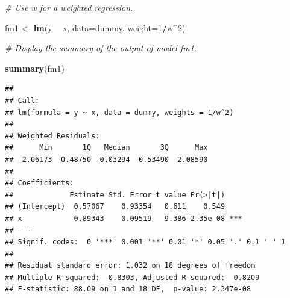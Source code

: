\documentclass[]{book}
\newenvironment{Shaded}{\begin{snugshade}}{\end{snugshade}}
\newcommand{\CommentTok}[1]{\textcolor[rgb]{0.56,0.35,0.01}{\textit{#1}}}
\newcommand{\DataTypeTok}[1]{\textcolor[rgb]{0.13,0.29,0.53}{#1}}
\newcommand{\DecValTok}[1]{\textcolor[rgb]{0.00,0.00,0.81}{#1}}
\newcommand{\KeywordTok}[1]{\textcolor[rgb]{0.13,0.29,0.53}{\textbf{#1}}}
\newcommand{\NormalTok}[1]{#1}
\newcommand{\OperatorTok}[1]{\textcolor[rgb]{0.81,0.36,0.00}{\textbf{#1}}}
\newcommand{\StringTok}[1]{\textcolor[rgb]{0.31,0.60,0.02}{#1}}
\begin{document}
\begin{Shaded}
\begin{Highlighting}[]
\CommentTok{# Use w for a weighted regression.}

\NormalTok{fm1 <-}\StringTok{ }\KeywordTok{lm}\NormalTok{(y }\OperatorTok{~}\StringTok{ }\NormalTok{x, }\DataTypeTok{data=}\NormalTok{dummy, }\DataTypeTok{weight=}\DecValTok{1}\OperatorTok{/}\NormalTok{w}\OperatorTok{^}\DecValTok{2}\NormalTok{) }

\CommentTok{# Display the summary of the output of model fm1.}

\KeywordTok{summary}\NormalTok{(fm1)}
\end{Highlighting}
\end{Shaded}

\begin{verbatim}
## 
## Call:
## lm(formula = y ~ x, data = dummy, weights = 1/w^2)
## 
## Weighted Residuals:
##      Min       1Q   Median       3Q      Max 
## -2.06173 -0.48750 -0.03294  0.53490  2.08590 
## 
## Coefficients:
##             Estimate Std. Error t value Pr(>|t|)    
## (Intercept)  0.57067    0.93354   0.611    0.549    
## x            0.89343    0.09519   9.386 2.35e-08 ***
## ---
## Signif. codes:  0 '***' 0.001 '**' 0.01 '*' 0.05 '.' 0.1 ' ' 1
## 
## Residual standard error: 1.032 on 18 degrees of freedom
## Multiple R-squared:  0.8303, Adjusted R-squared:  0.8209 
## F-statistic: 88.09 on 1 and 18 DF,  p-value: 2.347e-08
\end{verbatim}

\begin{Shaded}
\end{Shaded}
\end{document}
